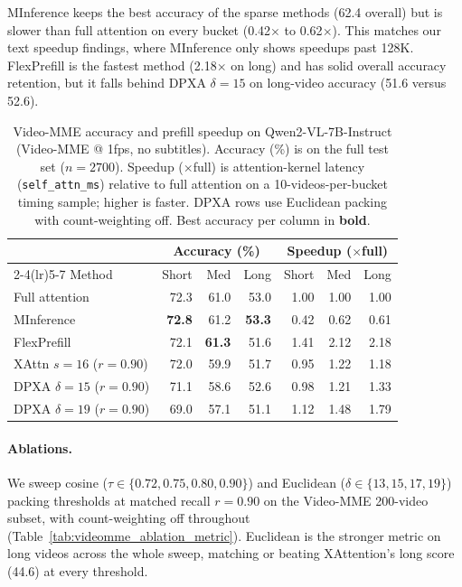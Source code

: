 MInference keeps the best accuracy of the sparse methods (62.4 overall) but is slower than full attention on every bucket (0.42$\times$ to 0.62$\times$). This matches our text speedup findings, where MInference only shows speedups past 128K. FlexPrefill is the fastest method (2.18$\times$ on long) and has solid overall accuracy retention, but it falls behind DPXA $\delta{=}15$ on long-video accuracy (51.6 versus 52.6).

\begin{table}[!ht]
\centering
\caption{Video-MME accuracy and prefill speedup on Qwen2-VL-7B-Instruct (Video-MME @ 1fps, no subtitles). Accuracy (\%) is on the full test set ($n{=}2700$). Speedup ($\times$full) is attention-kernel latency (\texttt{self\_attn\_ms}) relative to full attention on a 10-videos-per-bucket timing sample; higher is faster. DPXA rows use Euclidean packing with count-weighting off. Best accuracy per column in \textbf{bold}.}
\label{tab:videomme_main}
\begin{tabular}{lrrrrrr}
\toprule
 & \multicolumn{3}{c}{Accuracy (\%)} & \multicolumn{3}{c}{Speedup ($\times$full)} \\
\cmidrule(lr){2-4}\cmidrule(lr){5-7}
Method & Short & Med & Long & Short & Med & Long \\
\midrule
Full attention                    & 72.3 & 61.0 & 53.0 & 1.00 & 1.00 & 1.00 \\
MInference                        & \textbf{72.8} & 61.2 & \textbf{53.3} & 0.42 & 0.62 & 0.61 \\
FlexPrefill                        & 72.1 & \textbf{61.3} & 51.6 & 1.41 & 2.12 & 2.18 \\
XAttn $s{=}16$ ($r{=}0.90$)       & 72.0 & 59.9 & 51.7 & 0.95 & 1.22 & 1.18 \\
\midrule
DPXA $\delta{=}15$ ($r{=}0.90$)   & 71.1 & 58.6 & 52.6 & 0.98 & 1.21 & 1.33 \\
DPXA $\delta{=}19$ ($r{=}0.90$)   & 69.0 & 57.1 & 51.1 & 1.12 & 1.48 & 1.79 \\
\bottomrule
\end{tabular}
\end{table}

\paragraph{Ablations.}

We sweep cosine ($\tau \in \{0.72, 0.75, 0.80, 0.90\}$) and Euclidean ($\delta \in \{13, 15, 17, 19\}$) packing thresholds at matched recall $r{=}0.90$ on the Video-MME 200-video subset, with count-weighting off throughout (Table~\ref{tab:videomme_ablation_metric}). Euclidean is the stronger metric on long videos across the whole sweep, matching or beating XAttention's long score (44.6) at every threshold.

